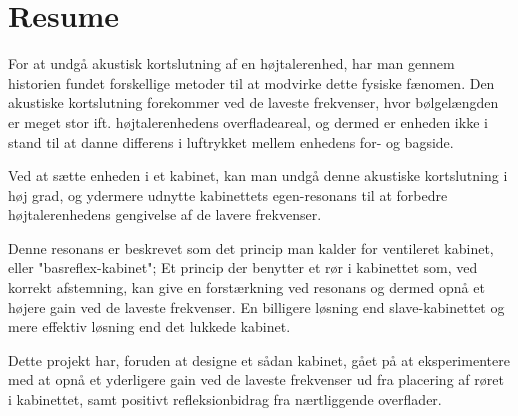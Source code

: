 \chapter*{Resume}

For at undgå akustisk kortslutning af en højtalerenhed, har man gennem historien fundet forskellige metoder til at modvirke dette fysiske fænomen. 
Den akustiske kortslutning forekommer ved de laveste frekvenser, hvor bølgelængden er meget stor ift. højtalerenhedens overfladeareal, og dermed er enheden ikke i stand til at danne differens i luftrykket mellem enhedens for- og bagside.

Ved at sætte enheden i et kabinet, kan man undgå denne akustiske kortslutning i høj grad, og ydermere udnytte kabinettets egen-resonans til at forbedre højtalerenhedens gengivelse af de lavere frekvenser. 

Denne resonans er beskrevet som det princip man kalder for ventileret kabinet, eller "basreflex-kabinet"; Et princip der benytter et rør i kabinettet som, ved korrekt afstemning, kan give en forstærkning ved resonans og dermed opnå et højere gain ved de laveste frekvenser. En billigere løsning end slave-kabinettet og mere effektiv løsning end det lukkede kabinet. 

Dette projekt har, foruden at designe et sådan kabinet, gået på at eksperimentere med at opnå et yderligere gain ved de laveste frekvenser ud fra placering af røret i kabinettet, samt positivt refleksionbidrag fra nærtliggende overflader. 


